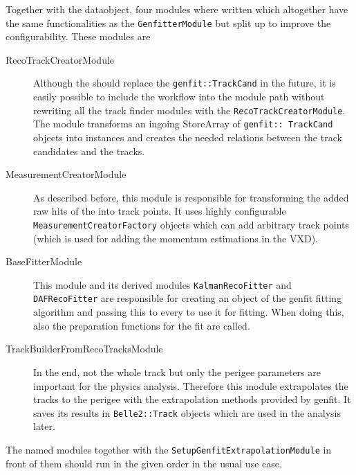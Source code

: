 Together with the \RecoTrack dataobject, four modules where written which altogether have the same functionalities as the \texttt{GenfitterModule} but split up to improve the configurability. These modules are
\begin{description}
 \item[RecoTrackCreatorModule] Although the \RecoTrack should replace the \texttt{genfit::Track\-Cand} in the future, it is easily possible to include the \RecoTrack workflow into the module path without rewriting all the track finder modules with the \texttt{Reco\-Track\-Creator\-Module}. The module transforms an ingoing StoreArray of \texttt{genfit::\ Track\-Cand} objects into \RecoTrack instances and creates the needed relations between the track candidates and the tracks.
 \item[MeasurementCreatorModule] As described before, this module is responsible for transforming the added raw hits of the \RecoTrack into track points. It uses highly configurable \texttt{MeasurementCreatorFactory} objects which can add arbitrary track points (which is used for adding the momentum estimations in the VXD).
 \item[BaseFitterModule] This module and its derived modules \texttt{KalmanRecoFitter} and \texttt{DAF\-Reco\-Fitter} are responsible for creating an object of the genfit fitting algorithm and passing this to every \RecoTrack to use it for fitting. When doing this, also the preparation functions for the fit are called.
 \item[TrackBuilderFromRecoTracksModule] In the end, not the whole track but only the perigee parameters are important for the physics analysis. Therefore this module extrapolates the tracks to the perigee with the extrapolation methods provided by genfit. It saves its results in \texttt{Belle2::Track} objects which are used in the analysis later.
\end{description}

The named modules together with the \texttt{SetupGenfitExtrapolationModule} in front of them should run in the given order in the usual use case.



